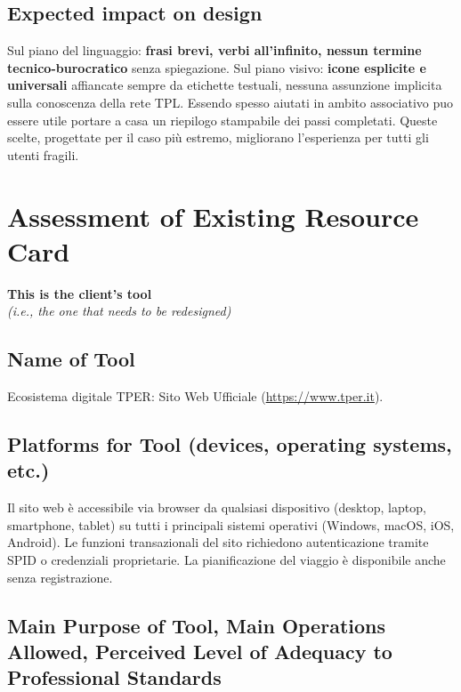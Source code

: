 \documentclass[11pt,a4paper]{article}
\begin{document}
\subsection*{Expected impact on design}
\begin{tcolorbox}[colback=backgroundColor,colframe=borderColor,arc=2mm]
 Sul piano del linguaggio: \textbf{frasi brevi, verbi all'infinito, nessun termine tecnico-burocratico} senza spiegazione. Sul piano visivo: \textbf{icone esplicite e universali} affiancate sempre da etichette testuali, nessuna assunzione implicita sulla conoscenza della rete TPL. Essendo spesso aiutati in ambito associativo puo essere utile portare a casa un riepilogo stampabile dei passi completati. Queste scelte, progettate per il caso più estremo, migliorano l'esperienza per tutti gli utenti fragili.
\end{tcolorbox}

\newpage
\section*{Assessment of Existing Resource Card}

\textbf{This is the client's tool}\\
\textit{(i.e., the one that needs to be redesigned)}

\bigskip

\subsection*{Name of Tool}

\noindent Ecosistema digitale TPER: Sito Web Ufficiale (\url{https://www.tper.it}).

\subsection*{Platforms for Tool (devices, operating systems, etc.)}

\noindent Il sito web è accessibile via browser da qualsiasi dispositivo (desktop, laptop, smartphone, tablet) su tutti i principali sistemi operativi (Windows, macOS, iOS, Android). Le funzioni transazionali del sito richiedono autenticazione tramite SPID o credenziali proprietarie. La pianificazione del viaggio è disponibile anche senza registrazione.

\subsection*{Main Purpose of Tool, Main Operations Allowed, Perceived Level of Adequacy to Professional Standards}
\end{document}
